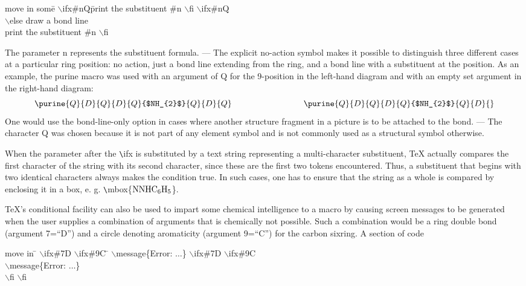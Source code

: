  \begin{tabbing}
  move in some\= $\backslash $ifx\#nQ\= print the substituent \#n
                                        $\backslash $fi\+ \kill
                 $\backslash $ifx\#nQ\>                      \\
                 $\backslash $else   \> draw a bond line \+  \\
                 print the substituent \#n $\backslash $fi
  \end{tabbing}

 The parameter n represents the substituent formula. --- 
 The explicit no-action symbol makes it possible to distinguish
 three different cases at a particular ring position: no action,
 just a bond line extending from the ring, and a bond line with 
 a substituent at the position. As an example, the purine macro
 was used with an argument of Q for the 9-position in the 
 left-hand diagram and with an empty set argument in the
 right-hand diagram:
 \[ \purine{Q}{D}{Q}{D}{Q}{$NH_{2}$}{Q}{D}{Q}
    \hspace{3cm}\purine{Q}{D}{Q}{D}{Q}{$NH_{2}$}{Q}{D}{}  \]
 One would use the bond-line-only option in cases where another
 structure fragment in a picture is to be attached to the bond.
 --- The character Q was chosen because it is not part of any
 element symbol and is not commonly used as a structural symbol
 otherwise.
 
 When the parameter after the \verb+\+ifx is substituted by a
 text string representing a multi-character substituent, TeX
 actually compares the first character of the string with its
 second character, since these are the first two tokens 
 encountered. Thus, a substituent that begins with two identical
 characters always makes the condition true. In such cases,
 one has to ensure that the string as a whole is compared by
 enclosing it in a box, e. g. \verb+\+mbox\{${\rm NNHC_{6}H_{5}}$\}.
  
 TeX's conditional facility can also be used to impart some
 chemical intelligence to a macro by causing screen messages
 to be generated when the user supplies a combination of
 arguments that is chemically not possible. Such a combination
 would be a ring double bond (argument 7=``D'') and a 
 circle denoting aromaticity (argument 9=``C'') for the
 carbon sixring. A section of code  
 
 \begin{tabbing}
  move in \= $\backslash $ifx\#7D  $\backslash $ifx\#9C
          \= $\backslash $message\{Error: $\ldots $\}\+ \kill
          $\backslash $ifx\#7D  $\backslash $ifx\#9C \> \+ \\
          $\backslash $message\{Error: $\ldots $\} \- \\
          $\backslash $fi  $\backslash $fi
  \end{tabbing}
 

